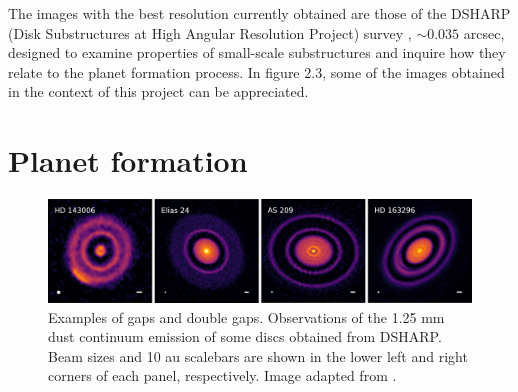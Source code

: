 \documentclass[a4paper,10pt]{report}
\begin{document}
The images with the best resolution currently obtained are those of the DSHARP (Disk Substructures at High Angular Resolution Project) survey \citep{dsharp}, $\sim 0.035$ arcsec, designed to examine properties
of small-scale substructures and inquire how they relate to the planet formation process. In figure 2.3, some of the images obtained in the context of this project
can be appreciated.

\section{Planet formation}

\begin{figure}
    \begin{center}
        \includegraphics[width=\textwidth]{images/alma_pictures.jpg}
    \end{center}
    \caption{Examples of gaps and double gaps. 
    Observations of the 1.25 mm dust continuum emission of some discs obtained from DSHARP.
    Beam sizes and 10 au scalebars are shown in the lower left and right corners of each panel, respectively.
    Image adapted from \citet{Andrews_2018}.}
\end{figure}

\end{document}
